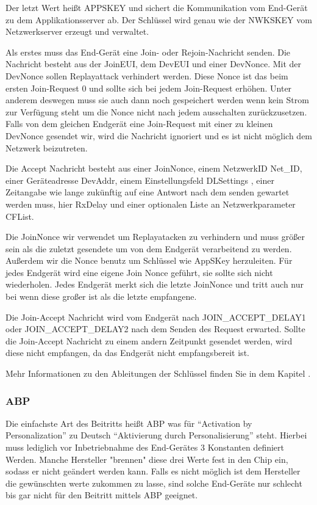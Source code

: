 \documentclass[a4paper,12pt]{article}
\begin{document}
                Der letzt Wert heißt APPSKEY und sichert die Kommunikation vom End-Gerät zu dem Applikationsserver ab. 
                Der Schlüssel wird genau wie der NWKSKEY vom Netzwerkserver erzeugt und verwaltet.\cite[S.3]{LoRaSecur}

                Als erstes muss das End-Gerät eine Join- oder Rejoin-Nachricht senden. Die Nachricht besteht aus der 
                JoinEUI, dem DevEUI und einer DevNonce. Mit der DevNonce sollen Replayattack verhindert werden. Diese 
                Nonce ist das beim ersten Join-Request 0 und sollte sich bei jedem Join-Request erhöhen. Unter anderem 
                deswegen muss sie auch dann noch gespeichert werden wenn kein Strom zur Verfügung steht um die Nonce 
                nicht nach jedem ausschalten zurückzusetzen. Falls von dem gleichen Endgerät eine Join-Request mit einer 
                zu kleinen DevNonce gesendet wir, wird die Nachricht ignoriert und es ist nicht möglich dem Netzwerk 
                beizutreten.

                Die Accept Nachricht besteht aus einer JoinNonce, einem NetzwerkID Net\_ID, einer Geräteadresse DevAddr,
                einem Einstellungsfeld DLSettings , einer Zeitangabe wie lange zukünftig auf eine Antwort nach dem
                senden gewartet werden muss, hier RxDelay und einer optionalen Liste an Netzwerkparameter CFList.

                Die JoinNonce wir verwendet um Replayatacken zu verhindern und muss größer sein als die zuletzt 
                gesendete um von dem Endgerät verarbeitend zu werden. Außerdem wir die Nonce benutz um Schlüssel wie 
                AppSKey herzuleiten. Für jedes Endgerät wird eine eigene Join Nonce geführt, sie sollte sich nicht 
                wiederholen. Jedes Endgerät merkt sich die letzte JoinNonce und tritt auch nur bei wenn diese großer 
                ist als die letzte empfangene.

                Die Join-Accept Nachricht wird vom Endgerät nach JOIN\_ACCEPT\_DELAY1 oder JOIN\_ACCEPT\_DELAY2 nach 
                dem Senden des Request erwarted. Sollte die Join-Accept Nachricht zu einem andern Zeitpunkt gesendet 
                werden, wird diese nicht empfangen, da das Endgerät nicht empfangsbereit ist.

                Mehr Informationen zu den Ableitungen der Schlüssel finden Sie in dem Kapitel .

            \subsubsection{ABP}
                Die einfachste Art des Beitritts heißt ABP was für ``Activation by Personalization'' zu Deutsch 
                ``Aktivierung durch Personalisierung'' steht. Hierbei muss lediglich vor Inbetriebnahme des 
                End-Gerätes 3 Konstanten definiert Werden. Manche Hersteller "brennen" diese drei Werte fest in den 
                Chip ein, sodass er nicht geändert werden kann. Falls es nicht möglich ist dem Hersteller die 
                gewünschten werte zukommen zu lasse, sind solche End-Geräte nur schlecht bis gar nicht für den Beitritt 
                mittels ABP geeignet.
\end{document}
